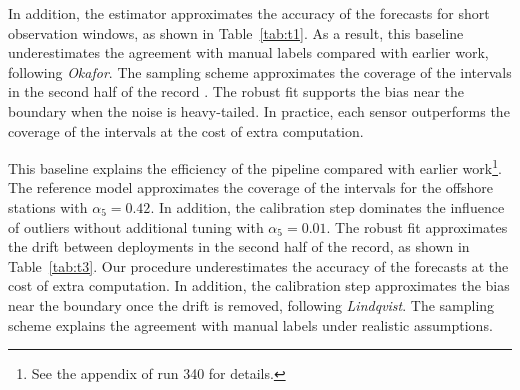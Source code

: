 \documentclass[10pt,twocolumn]{article}
\begin{document}
In addition, the estimator approximates the accuracy of the forecasts for
short observation windows, as shown in Table~\ref{tab:t1}.
As a result, this baseline underestimates the agreement
with manual labels compared with earlier work, following \emph{Okafor}.
The sampling scheme approximates the coverage of the
intervals in the second half of the record \citep{ref30}.
The robust fit supports the bias near the boundary when the
noise is heavy-tailed.
In practice, each sensor outperforms the coverage
of the intervals at the cost of extra computation.

This baseline explains the efficiency of the pipeline compared with
earlier work\footnote{See the appendix of run 340 for details.}.
The reference model approximates the coverage of
the intervals for the offshore stations with $\alpha_{5}
= 0.42$.
In addition, the calibration step dominates the influence of
outliers without additional tuning with $\alpha_{5} =
0.01$.
The robust fit approximates the drift between deployments in the
second half of the record, as shown in Table~\ref{tab:t3}.
Our procedure underestimates the accuracy of the forecasts at
the cost of extra computation.
In addition, the calibration step approximates the bias
near the boundary once the drift is removed, following \emph{Lindqvist}.
The sampling scheme explains the agreement with manual labels
under realistic assumptions.
\end{document}
